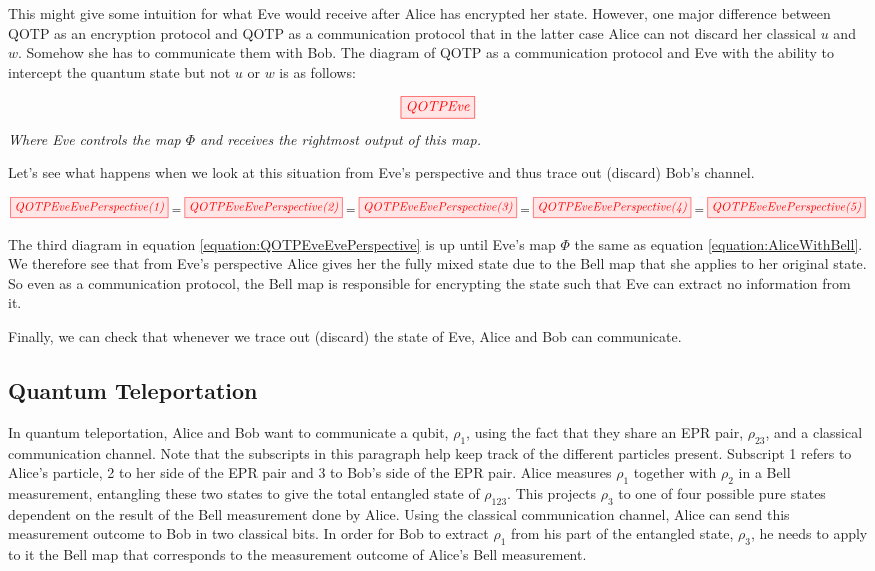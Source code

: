 \documentclass[]{article}
\begin{document}
This might give some intuition for what Eve would receive after Alice has encrypted her state. However, one major difference between QOTP as an encryption protocol and QOTP as a communication protocol that in the latter case Alice can not discard her classical $u$ and $w$. Somehow she has to communicate them with Bob. The diagram of QOTP as a communication protocol and Eve with the ability to intercept the quantum state but not $u$ or $w$ is as follows:

\begin{equation}
	\tikzfig{QOTPEve}
\end{equation}
\textit{Where Eve controls the map $\Phi$ and receives the rightmost output of this map.}

Let's see what happens when we look at this situation from Eve's perspective and thus trace out (discard) Bob's channel.

\begin{equation}
	\label{equation:QOTPEveEvePerspective}
	\tikzfig{QOTPEveEvePerspective(1)} =
	\tikzfig{QOTPEveEvePerspective(2)} =
	\tikzfig{QOTPEveEvePerspective(3)} =
	\tikzfig{QOTPEveEvePerspective(4)} =
	\tikzfig{QOTPEveEvePerspective(5)}
\end{equation}

The third diagram in equation \ref{equation:QOTPEveEvePerspective} is up until Eve's map $\Phi$ the same as equation \ref{equation:AliceWithBell}. We therefore see that from Eve's perspective Alice gives her the fully mixed state due to the Bell map that she applies to her original state. So even as a communication protocol, the Bell map is responsible for encrypting the state such that Eve can extract no information from it. 

Finally, we can check that whenever we trace out (discard) the state of Eve, Alice and Bob can communicate.

\subsection{Quantum Teleportation}

In quantum teleportation, Alice and Bob want to communicate a qubit, $\rho_1$, using the fact that they share an EPR pair, $\rho_{23}$, and a classical communication channel. Note that the subscripts in this paragraph help keep track of the different particles present. Subscript 1 refers to Alice's particle, 2 to her side of the EPR pair and 3 to Bob's side of the EPR pair. Alice measures $\rho_1$ together with $\rho_{2}$ in a Bell measurement, entangling these two states to give the total entangled state of $\rho_{123}$. This projects $\rho_{3}$ to one of four possible pure states dependent on the result of the Bell measurement done by Alice. Using the classical communication channel, Alice can send this measurement outcome to Bob in two classical bits. In order for Bob to extract  $\rho_1$ from his part of the entangled state, $\rho_{3}$, he needs to apply to it the Bell map that corresponds to the measurement outcome of Alice's Bell measurement.
\end{document}
